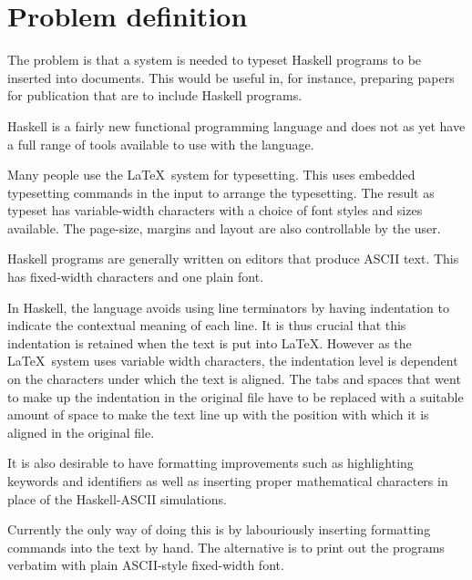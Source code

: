 \section{Problem definition}

The problem is that a system is needed to typeset Haskell programs
to be inserted into documents.  This would be useful in, for
instance, preparing papers for publication that are to include
Haskell programs. 

Haskell is a fairly new functional programming language and does not
as yet have a full range of tools available to use with the language.

Many people use the \LaTeX\ system for typesetting.  This uses
embedded typesetting commands in the input to arrange the typesetting.
The result as typeset has variable-width characters with a choice of
font styles and sizes available.  The page-size, margins and layout
are also controllable by the user.

Haskell programs are generally written on editors that produce ASCII
text.  This has fixed-width characters and one plain font.

In Haskell, the language avoids using
line terminators by having indentation to indicate the contextual meaning of
each line. It is thus crucial that this indentation is retained
when the text is put into \LaTeX.  However as the \LaTeX\ system uses
variable width characters, the indentation
level is dependent on the characters under which the text is aligned.
The tabs and spaces that went to make
up the indentation in the original file have to be replaced with a 
suitable amount of space to make the text line up with the position with which it
is aligned in the original file. 

It is also desirable to have
formatting improvements such as highlighting keywords and identifiers as well as
inserting proper mathematical characters in place of the Haskell-ASCII simulations.

Currently the only way of doing this is by labouriously inserting formatting
commands into the text by hand.  The alternative is to print out the programs
verbatim with plain ASCII-style fixed-width font.
